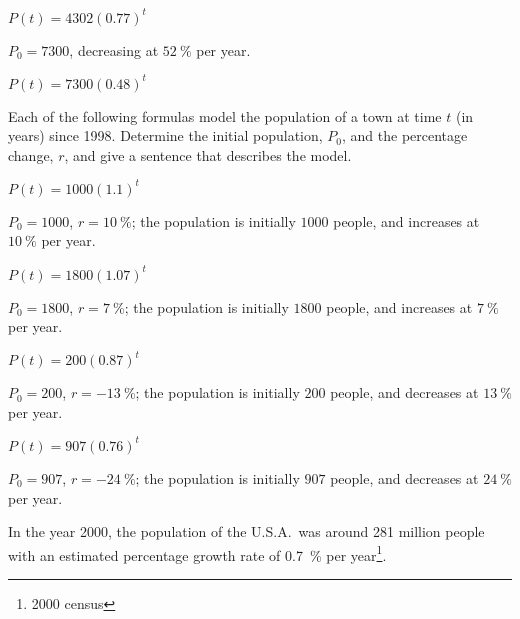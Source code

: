 \begin{exercises}
\begin{problem}
\begin{multicols}{2}
\begin{subproblem}
\begin{shortsolution}
			$P(t)=4302(0.77)^t$ 
		\end{shortsolution}
	\end{subproblem}
	\begin{subproblem}
		$P_0=7300$, decreasing at $\SI{52}{\percent}$ per year.
		\begin{shortsolution}
			$P(t)=7300(0.48)^t$ 
		\end{shortsolution}
	\end{subproblem}
\end{multicols}
\end{problem}
\begin{problem}
Each of the following formulas model the population of a town 
at time $t$ (in years) since 1998. Determine the initial population, $P_0$,
and the percentage change, $r$, and give a sentence that describes the model.
\begin{multicols}{2}
	\begin{subproblem}
		$P(t)=1000(1.1)^t$ 
		\begin{shortsolution}
			$P_0=1000$, $r=\SI{10}{\percent}$; the population is initially $1000$ people, and 
			increases at $\SI{10}{\percent}$ per year.
		\end{shortsolution}
	\end{subproblem}
	\begin{subproblem}
		$P(t)=1800(1.07)^t$ 
		\begin{shortsolution}
			$P_0=1800$, $r=\SI{7}{\percent}$; the population is initially $1800$ people, and increases
			at $\SI{7}{\percent}$ per year.
		\end{shortsolution}
	\end{subproblem}
	\begin{subproblem}
		$P(t)=200(0.87)^t$ 
		\begin{shortsolution}
			$P_0=200$, $r=\SI{-13}{\percent}$; the population is initially $200$ people, and decreases
			at $\SI{13}{\percent}$ per year.
		\end{shortsolution}
	\end{subproblem}
	\begin{subproblem}
		$P(t)=907(0.76)^t$ 
		\begin{shortsolution}
			$P_0=907$, $r=\SI{-24}{\percent}$; the population is initially $907$ people, and decreases
			at $\SI{24}{\percent}$ per year.
		\end{shortsolution}
	\end{subproblem}
\end{multicols}
\end{problem}
\begin{problem}[US population]
In the year 2000, the population of the U.S.A.\ was around 281 million people with an estimated 
percentage growth rate of \SI{0.7}{\percent} per year\footnote{2000 census}.
			

\end{problem}
\end{exercises}
